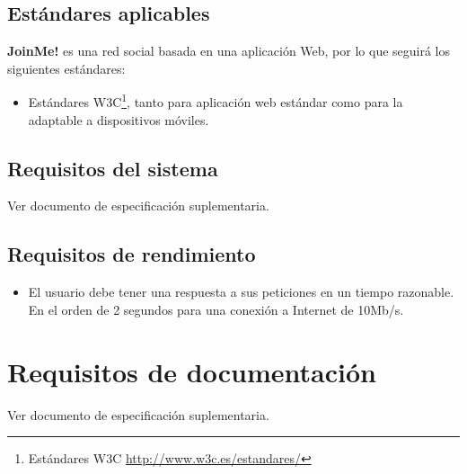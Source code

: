 \documentclass[12pt, a4paper, titlepage]{article}
\begin{document}
\subsection{Estándares aplicables}

\textbf{JoinMe!} es una red social basada en una aplicación Web, por lo que seguirá los siguientes estándares:
\begin{itemize}
\item Estándares W3C\footnote{Estándares W3C \url{http://www.w3c.es/estandares/}}, tanto para aplicación web estándar como para la adaptable a dispositivos móviles.
\end{itemize}

\subsection{Requisitos del sistema}

Ver documento de especificación suplementaria.

\subsection{Requisitos de rendimiento}


\begin{itemize}
\item El usuario debe tener una respuesta a sus peticiones en un tiempo razonable. En el orden de 2 segundos para una conexión a Internet de 10Mb/s.

\end{itemize}

\section{Requisitos de documentación}

Ver documento de especificación suplementaria.



\end{document}
